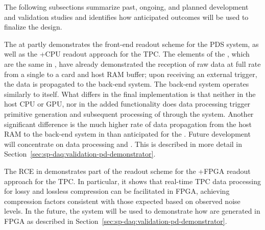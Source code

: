 The following subsections summarize past, ongoing, and planned
development and validation studies and identifies how anticipated outcomes
will be used to finalize the  design.

\label{sec:sp-daq:validation-pdune-felix}


The     at  partly demonstrates the front-end readout scheme for
the PDS system, as well as the   +CPU readout approach for the
TPC. The elements of the     , which are the
same in , have already demonstrated the
reception of raw data at full rate from a single  to a 
   card and    host RAM buffer; upon receiving an external trigger, the
data is propagated to the back-end system. The back-end system
operates similarly to  itself. What differs in the final 
implementation is that neither in the host CPU or
GPU, nor in the added  functionality does data processing  trigger primitive  generation and subsequent processing
of  through the  system. Another
significant difference is the much higher rate of data propagation from the
host RAM to the back-end system in  than anticipated for the . Future development
will concentrate on data processing and .  This is described in more detail in Section~\ref{sec:sp-daq:validation-pd-demonstrator}.

\label{sec:sp-daq:validation-pdune-rce}

The RCE  in  demonstrates part of the readout scheme for
the   +FPGA readout approach for the TPC. In particular, it
shows that real-time TPC data processing for lossy
and lossless compression can be facilitated in FPGA, achieving
compression factors consistent with those expected based on observed
 noise levels. In the future, the system will be used
to demonstrate how  are generated in FPGA as
described in Section~\ref{sec:sp-daq:validation-pd-demonstrator}.

